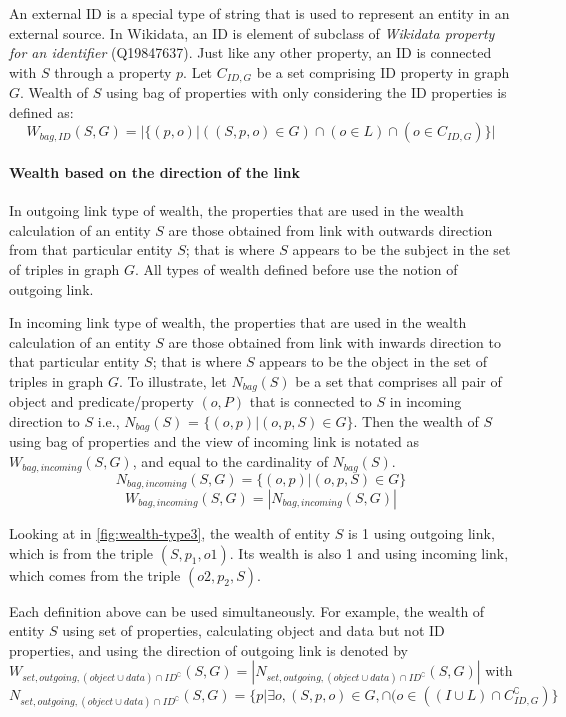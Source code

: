 \documentclass[
]{ceurart}
\begin{document}
An external ID is a special type of string that is used to represent an entity in an external source. In Wikidata, an ID is element of subclass of \textit{Wikidata property for an identifier} (Q19847637). Just like any other property, an ID is connected with \(S\) through a property \(p\). Let  \(C_{ID,G}\) be a set comprising ID property in graph \(G\). Wealth of \(S\) using bag of properties with only considering the ID properties is defined as:
\[
    W_{bag, ID}(S, G) = |\{(p,o) | ((S, p, o) \in G) \cap (o \in L) \cap (o \in C_{ID,G})\}|
\]

\paragraph{Wealth based on the direction of the link}
In outgoing link type of wealth, the properties that are used in the wealth calculation of an entity \(S\) are those obtained from link with outwards direction from that particular entity \(S\); that is where \(S\) appears to be the subject in the set of triples in graph \(G\). All types of wealth defined before use the notion of outgoing link.

In incoming link type of wealth, the properties that are used in the wealth calculation of an entity \(S\) are those obtained from link with inwards direction to that particular entity \(S\); that is where \(S\) appears to be the object in the set of triples in graph \(G\). To illustrate, let \(N_{bag}(S)\) be a set that comprises all pair of object and predicate/property \((o,P)\) that is connected to \(S\) in incoming direction to \(S\) i.e., \(N_{bag}(S)\) = \(\{(o, p) | (o, p, S) \in G\}\). Then the wealth of \(S\) using bag of properties and the view of incoming link is notated as \(W_{bag, incoming}(S, G)\), and equal to the cardinality of \(N_{bag}(S)\).
\[
    N_{bag, incoming}(S, G) = \{(o,p) | (o, p, S) \in G\}
\]
\[
    W_{bag, incoming}(S, G) = |N_{bag, incoming}(S, G)|
\]

Looking at in \autoref{fig:wealth-type3}, the wealth of entity \(S\) is 1 using outgoing link, which is from the triple \((S, p_1, o1)\). Its wealth is also 1 and using incoming link, which comes from the triple \((o2, p_2, S)\).

Each definition above can be used simultaneously. For example, the wealth of entity \(S\) using set of properties, calculating object and data but not ID properties, and using the direction of outgoing link is denoted by \(W_{set, outgoing, (object \cup data) \cap ID^\complement}(S, G) = |N_{set, outgoing, (object \cup data) \cap ID^\complement}(S, G)|\) with \(N_{set, outgoing, (object \cup data) \cap ID^\complement}(S, G) = \{p | \exists o, (S, p, o) \in G, \cap (o \in ((I \cup L) \cap C_{ID,G}^\complement)\}\)
\end{document}
